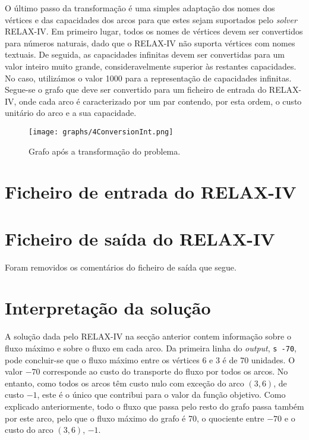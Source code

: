 \documentclass[12pt, a4paper, titlepage]{article}
\begin{document}
O último passo da transformação é uma simples adaptação dos nomes dos vértices e das capacidades dos
arcos para que estes sejam suportados pelo \emph{solver} RELAX-IV. Em primeiro lugar, todos os nomes
de vértices devem ser convertidos para números naturais, dado que o RELAX-IV não suporta vértices
com nomes textuais. De seguida, as capacidades infinitas devem ser convertidas para um valor inteiro
muito grande, consideravelmente superior às restantes capacidades. No caso, utilizámos o valor 1000
para a representação de capacidades infinitas. Segue-se o grafo que deve ser convertido para um
ficheiro de entrada do RELAX-IV, onde cada arco é caracterizado por um par contendo, por esta ordem,
o custo unitário do arco e a sua capacidade.

\begin{figure}[H]
    \centering
    \texttt{[image: graphs/4ConversionInt.png]}
    \caption{Grafo após a transformação do problema.}
    \label{4conversion-graph}
\end{figure}

\section{Ficheiro de entrada do RELAX-IV}


\section{Ficheiro de saída do RELAX-IV}
Foram removidos os comentários do ficheiro de saída que segue.


\section{Interpretação da solução}

A solução dada pelo RELAX-IV na secção anterior contem informação sobre o fluxo máximo e sobre o
fluxo em cada arco. Da primeira linha do \emph{output}, \texttt{s -70}, pode concluir-se que o fluxo
máximo entre os vértices 6 e 3 é de 70 unidades. O valor $-70$ corresponde ao custo do transporte
do fluxo por todos os arcos. No entanto, como todos os arcos têm custo nulo com exceção do arco
$(3, 6)$, de custo $-1$, este é o único que contribui para o valor da função objetivo. Como
explicado anteriormente, todo o fluxo que passa pelo resto do grafo passa também por este arco, pelo
que o fluxo máximo do grafo é 70, o quociente entre $-70$ e o custo do arco $(3, 6)$, $-1$.
\end{document}

